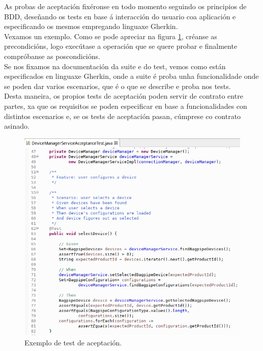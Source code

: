  As probas de aceptación fixéronse en todo momento seguindo os principios de
 BDD, deseñando os tests en base á interacción do usuario coa aplicación e
 especificando os mesmos empregando linguaxe Gherkin. \\
 
 Vexamos un exemplo. Como se pode apreciar na figura \ref{figura:TestAceptacion},
 créanse as precondicións, logo execútase a operación que se quere probar e
 finalmente compróbanse as poscondicións. \\
 
 Se nos fixamos na documentación da suite e do test, vemos como están
 especificados en linguaxe Gherkin, onde a suite é proba unha funcionalidade
 onde se poden dar varios escenarios, que é o que se describe e proba nos
 tests. \\
 
 Desta maneira, os propios tests de aceptación poden servir de contrato entre
 partes, xa que os requisitos se poden especificar en base a funcionalidades con
 distintos escenarios e, se os tests de aceptación pasan, cúmprese co
 contrato asinado. \\
  
 \begin{figure}[htbp]
  \centering
  \includegraphics[scale=0.8,keepaspectratio=true]{./imagenes/test-aceptacion.png}
  \caption{Exemplo de test de aceptación.}
  \label{figura:TestAceptacion}
 \end{figure}
 
